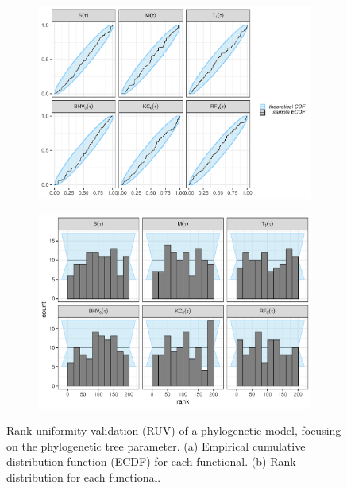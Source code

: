 \documentclass[oneside]{article}
\begin{document}
\begin{figure}
  \centering
  \vspace{0pt}
  \begin{subfigure}[t]{\textwidth}
    \caption{}
    \centering
    \includegraphics[scale=0.5]{../figures/ECDFs_SBC.pdf} 
  \end{subfigure}
  \vspace{0pt}
  \hspace{1cm}
  \begin{subfigure}[t]{\textwidth}
    \caption{}
    \centering
    \includegraphics[scale=0.5]{../figures/hists_SBC.pdf}    
  \end{subfigure}
  \hfill
   \caption{Rank-uniformity validation (RUV) of a phylogenetic
     model, focusing on the phylogenetic tree parameter.
     (a) Empirical cumulative distribution function (ECDF) for each
     functional.
     (b) Rank distribution for each functional.
   }
   \label{supfig:sbc}
\end{figure}
\end{document}

